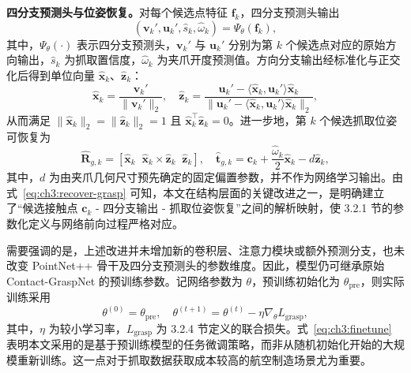 \textbf{四分支预测头与位姿恢复。}对每个候选点特征 $\mathbf{f}_k$，四分支预测头输出
\begin{equation}
  \left(\mathbf{v}_k',\mathbf{u}_k',\hat{s}_k,\hat{\omega}_k\right)=\Psi_{\theta}\!\left(\mathbf{f}_k\right),
  \label{eq:ch3:head-output}
\end{equation}
其中，$\Psi_{\theta}(\cdot)$ 表示四分支预测头，$\mathbf{v}_k'$ 与 $\mathbf{u}_k'$ 分别为第 $k$ 个候选点对应的原始方向输出，$\hat{s}_k$ 为抓取置信度，$\hat{\omega}_k$ 为夹爪开度预测值。方向分支输出经标准化与正交化后得到单位向量 $\hat{\mathbf{x}}_k$、$\hat{\mathbf{z}}_k$：
\begin{equation}
  \hat{\mathbf{x}}_k=\frac{\mathbf{v}_k'}{\|\mathbf{v}_k'\|_2},\quad
  \hat{\mathbf{z}}_k=\frac{\mathbf{u}_k'-\langle\hat{\mathbf{x}}_k,\mathbf{u}_k'\rangle\hat{\mathbf{x}}_k}{\bigl\|\mathbf{u}_k'-\langle\hat{\mathbf{x}}_k,\mathbf{u}_k'\rangle\hat{\mathbf{x}}_k\bigr\|_2},
  \label{eq:ch3:ortho}
\end{equation}
从而满足 $\|\hat{\mathbf{x}}_k\|_2=\|\hat{\mathbf{z}}_k\|_2=1$ 且 $\hat{\mathbf{x}}_k^\top\hat{\mathbf{z}}_k=0$。进一步地，第 $k$ 个候选抓取位姿可恢复为
\begin{equation}
  \hat{\mathbf{R}}_{g,k}=
  \left[
  \hat{\mathbf{x}}_k\;\;
  \hat{\mathbf{x}}_k\times\hat{\mathbf{z}}_k\;\;
  \hat{\mathbf{z}}_k
  \right],\quad
  \hat{\mathbf{t}}_{g,k}=
  \mathbf{c}_k+\frac{\hat{\omega}_k}{2}\hat{\mathbf{x}}_k-d\hat{\mathbf{z}}_k,
  \label{eq:ch3:recover-grasp}
\end{equation}
其中，$d$ 为由夹爪几何尺寸预先确定的固定偏置参数，并不作为网络学习输出。由式~\eqref{eq:ch3:recover-grasp} 可知，本文在结构层面的关键改进之一，是明确建立了“候选接触点 $\mathbf{c}_k$ - 四分支输出 - 抓取位姿恢复”之间的解析映射，使 3.2.1 节的参数化定义与网络前向过程严格对应。

需要强调的是，上述改进并未增加新的卷积层、注意力模块或额外预测分支，也未改变 PointNet++ 骨干及四分支预测头的参数维度。因此，模型仍可继承原始 Contact-GraspNet 的预训练参数。记网络参数为 $\theta$，预训练初始化为 $\theta_{\mathrm{pre}}$，则实际训练采用
\begin{equation}
  \theta^{(0)}=\theta_{\mathrm{pre}},\quad
  \theta^{(t+1)}=\theta^{(t)}-\eta\nabla_{\theta}L_{\mathrm{grasp}},
  \label{eq:ch3:finetune}
\end{equation}
其中，$\eta$ 为较小学习率，$L_{\mathrm{grasp}}$ 为 3.2.4 节定义的联合损失。式~\eqref{eq:ch3:finetune} 表明本文采用的是基于预训练模型的任务微调策略，而非从随机初始化开始的大规模重新训练。这一点对于抓取数据获取成本较高的航空制造场景尤为重要。

